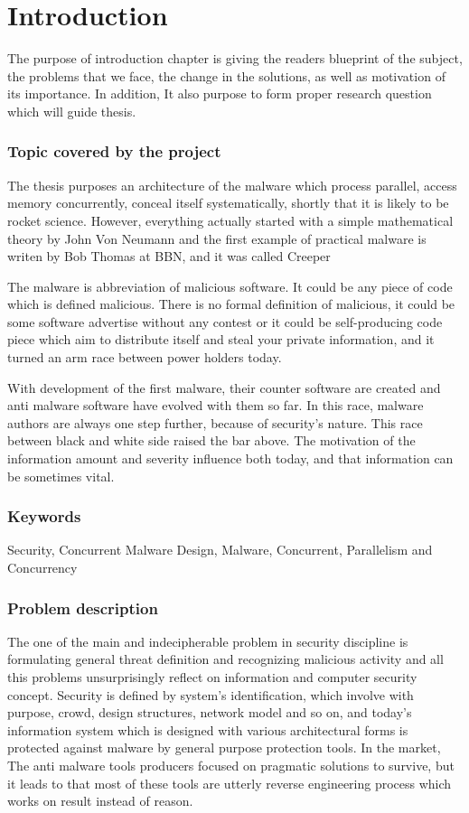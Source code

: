 \chapter{Introduction}
The purpose of introduction chapter is giving the readers blueprint of the subject, the problems that we face, the change in the solutions, as well as motivation of its importance. In addition, It also purpose to form proper research question which will guide thesis. 

\subsection{Topic covered by the project}
The thesis purposes an architecture of the malware which process parallel, access memory concurrently, conceal itself systematically, shortly that it is likely to be rocket science. However, everything actually started with a simple mathematical theory by John Von Neumann \cite{von1966theory} and the first example of practical malware is writen by Bob Thomas at BBN, and it was called Creeper 

The malware is abbreviation of malicious software. It could be any piece of code which is defined malicious. There is no formal definition of malicious, it could be some software advertise without any contest or it could be self-producing code piece which aim to distribute itself and steal your private information, and it turned an arm race between power holders today.

With development of the first malware, their counter software are created and anti malware software have evolved with them so far. In this race, malware authors are always one step further, because of security's nature. This race between black and white side raised the bar above. The motivation of the information amount and severity influence both today, and that information can be sometimes vital. 


\subsection{Keywords}
Security, Concurrent Malware Design, Malware, Concurrent, Parallelism and Concurrency

\subsection{Problem description}
The one of the main and indecipherable problem in security discipline is formulating general threat definition and recognizing malicious activity and all this problems unsurprisingly reflect on information and computer security concept. Security is defined by system’s identification, which involve with purpose, crowd, design structures, network model and so on, and today’s information system which is designed with various architectural forms is protected against malware by general purpose protection tools. In the market, The anti malware tools producers focused on pragmatic solutions to survive, but it leads to that most of these tools are utterly reverse engineering process which works on result instead of reason.

